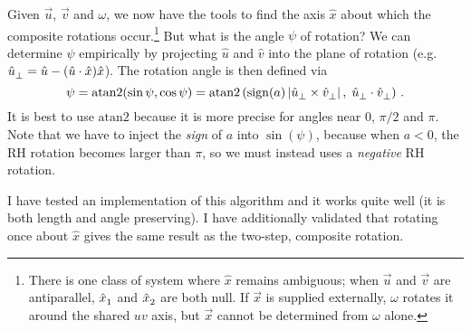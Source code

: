 \documentclass[12pt, nofootinbib, notitlepage]{revtex4}
\newcommand{\vecN}[1]{\hat{#1}}
\newcommand{\ang}{\psi}
\newcommand{\ax}{\vecN{x}}
\begin{document}
Given $\vec{u}$, $\vec{v}$ and $\omega$, we now have the tools to find the axis $\ax$
about which the composite rotations occur.\footnote
{\nobreak
	There is one class of system where $\ax$ remains ambiguous;
	when $\vec{u}$ and $\vec{v}$ are antiparallel, 
	$\ax_1\ds$ and $\ax_2\ds$ are both null.
	If $\vec{x}$ is supplied externally, 
	$\omega$ rotates it around the shared $uv$ axis,
	but $\vec{x}$ cannot be determined from $\omega$ alone.
}
But what is the angle $\ang$ of rotation?
We can determine $\psi$ empirically by projecting 
$\vecN{u}$ and $\vecN{v}$ into the plane of rotation (e.g. 
$\vecN{u}_\bot\ds = \vecN{u} - (\vecN{u}\cdot\vecN{x}) \vecN{x}$).
The rotation angle is then defined via
\begin{equation}
	\psi = \text{atan2}(\sin\psi, \cos\psi)
		= \text{atan2}\left(\text{sign}(a)\abs{\vecN{u}_\bot\ds \times \vecN{v}_\bot\ds},\; 
		\vecN{u}_\bot\ds \cdot \vecN{v}_\bot\ds\right)\,.
\end{equation}
It is best to use $\text{atan2}$ because it is more precise
for angles near $0$, $\pi/2$ and $\pi$. Note that we have to 
inject the \emph{sign} of $a$ into $\sin(\psi)$, 
because when $a<0$, the RH rotation becomes larger than 
$\pi$, so we must instead uses a \emph{negative} RH rotation.


I have tested an implementation of this algorithm and it works quite well
(it is both length and angle preserving). 
I have additionally validated that rotating once about $\ax$ gives 
the same result as the two-step, composite rotation.
\end{document}

